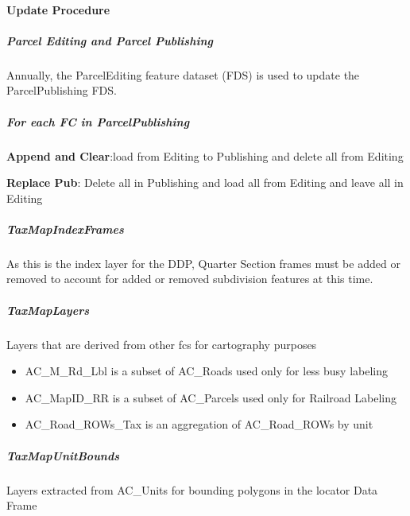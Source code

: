 \paragraph{Update Procedure}   
   
\subparagraph{Parcel Editing and Parcel Publishing}
Annually, the ParcelEditing feature dataset (FDS) is used to update the ParcelPublishing FDS.  


\subparagraph{For each FC in ParcelPublishing}

\noindent \textbf{Append and Clear}:load from Editing to Publishing and delete all from Editing

\noindent \textbf{Replace Pub}: Delete all in Publishing and load all from Editing and leave all in Editing 

\begin{table}[htbp]
\centering
{}
%
\end{table}
\clearpage
\subparagraph{TaxMapIndexFrames}As this is the index layer for the DDP, Quarter Section frames must be added or removed to account for added or removed subdivision features at this time.
\subparagraph{TaxMapLayers}Layers that are derived from other fcs for cartography purposes
\begin{itemize}
\item AC\_M\_Rd\_Lbl is a subset of AC\_Roads used only for less busy labeling
\item AC\_MapID\_RR is a subset of AC\_Parcels used only for Railroad Labeling
\item AC\_Road\_ROWs\_Tax is an aggregation of AC\_Road\_ROWs by unit
\end{itemize}
\subparagraph{TaxMapUnitBounds}Layers extracted from AC\_Units for bounding polygons in the locator Data Frame
\clearpage

